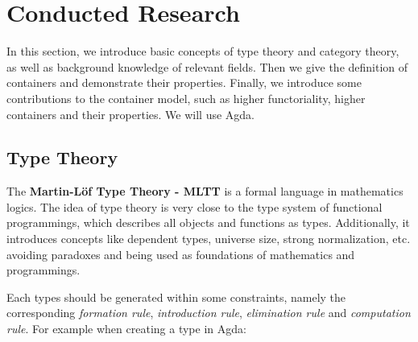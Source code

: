 \chapter{Conducted Research}

In this section, we introduce basic concepts of type theory and category theory, as well as background knowledge of relevant fields. Then we give the definition of containers and demonstrate their properties. Finally, we introduce some contributions to the container model, such as higher functoriality, higher containers and their properties. We will use Agda.

\section{Type Theory}

The \textbf{Martin-L\"of Type Theory - MLTT} is a formal language in mathematics logics. The idea of type theory is very close to the type system of functional programmings, which describes all objects and functions as types. Additionally, it introduces concepts like dependent types, universe size, strong normalization, etc. avoiding paradoxes and being used as foundations of mathematics and programmings.

Each types should be generated within some constraints, namely the corresponding \textit{formation rule}, \textit{introduction rule}, \textit{elimination rule} and \textit{computation rule}. For example when creating a type in Agda:

\begin{code}[hide]%
\>[0]\AgdaSpace{}%
\AgdaSpace{}%
\<%
\end{code}


